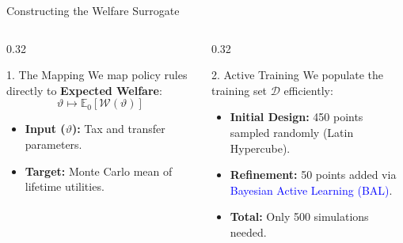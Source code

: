 \documentclass[aspectratio=1610]{beamer}
\begin{document}


\begin{frame}{Constructing the Welfare Surrogate}

    \begin{columns}[t]
    
        \begin{column}{0.32\textwidth}
            \begin{block}{1. The Mapping}
                \small
                We map policy rules directly to \textbf{Expected Welfare}:
                \[
                    \vartheta \longmapsto \mathbb{E}_0[\mathcal{W}(\vartheta)]
                \]
                \begin{itemize}
                    \item \textbf{Input ($\vartheta$):} Tax and transfer parameters.
                    \item \textbf{Target:} Monte Carlo mean of lifetime utilities.
                \end{itemize}
            \end{block}
        \end{column}

        \begin{column}{0.32\textwidth}
            \begin{block}{2. Active Training}
                \small
                We populate the training set $\mathcal{D}$ efficiently:
                \vspace{0.5em}
                \begin{itemize}
                    \item \textbf{Initial Design:} 450 points sampled randomly (Latin Hypercube).
                    \item \textbf{Refinement:} 50 points added via \textcolor{blue}{Bayesian Active Learning (BAL)}.
                    \item \textbf{Total:} Only 500 simulations needed.
                \end{itemize}
            \end{block}
        \end{column}


\end{columns}
\end{frame}
\end{document}
